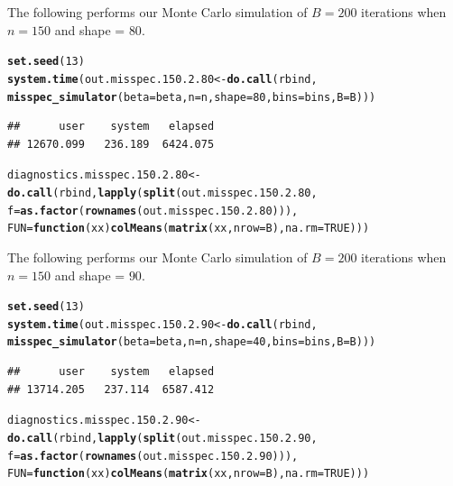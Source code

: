 \documentclass[11pt]{article}\usepackage[]{graphicx}\usepackage[]{color}
\makeatletter
\newcommand{\hlnum}[1]{\textcolor[rgb]{0.686,0.059,0.569}{#1}}%
\newcommand{\hlstd}[1]{\textcolor[rgb]{0.345,0.345,0.345}{#1}}%
\newcommand{\hlkwa}[1]{\textcolor[rgb]{0.161,0.373,0.58}{\textbf{#1}}}%
\newcommand{\hlkwb}[1]{\textcolor[rgb]{0.69,0.353,0.396}{#1}}%
\newcommand{\hlkwc}[1]{\textcolor[rgb]{0.333,0.667,0.333}{#1}}%
\newcommand{\hlkwd}[1]{\textcolor[rgb]{0.737,0.353,0.396}{\textbf{#1}}}%
\newenvironment{kframe}{%
 \def\at@end@of@kframe{}%
 \ifinner\ifhmode%
  \def\at@end@of@kframe{\end{minipage}}%
  \begin{minipage}{\columnwidth}%
 \fi\fi%
 \def\FrameCommand##1{\hskip\@totalleftmargin \hskip-\fboxsep
 \colorbox{shadecolor}{##1}\hskip-\fboxsep
     \hskip-\linewidth \hskip-\@totalleftmargin \hskip\columnwidth}%
 \MakeFramed {\advance\hsize-\width
   \@totalleftmargin\z@ \linewidth\hsize
   \@setminipage}}%
 {\par\unskip\endMakeFramed%
 \at@end@of@kframe}
\newenvironment{knitrout}{}{} %
\makeatother
\begin{document}
The following performs our Monte Carlo simulation of $B = 200$ iterations 
when $n = 150$ and shape = $80$.

\begin{knitrout}
\color{fgcolor}\begin{kframe}
\begin{alltt}
\hlkwd{set.seed}\hlstd{(}\hlnum{13}\hlstd{)}
\hlkwd{system.time}\hlstd{(out.misspec.150.2.80} \hlkwb{<-} \hlkwd{do.call}\hlstd{(rbind,}
  \hlkwd{misspec_simulator}\hlstd{(}\hlkwc{beta} \hlstd{= beta,} \hlkwc{n} \hlstd{= n,} \hlkwc{shape} \hlstd{=} \hlnum{80}\hlstd{,} \hlkwc{bins} \hlstd{= bins,} \hlkwc{B} \hlstd{= B)))}
\end{alltt}
\begin{verbatim}
##      user    system   elapsed 
## 12670.099   236.189  6424.075
\end{verbatim}
\begin{alltt}
\hlstd{diagnostics.misspec.150.2.80} \hlkwb{<-} \hlkwd{do.call}\hlstd{(rbind,} \hlkwd{lapply}\hlstd{(}\hlkwd{split}\hlstd{(out.misspec.150.2.80,}
  \hlkwc{f} \hlstd{=} \hlkwd{as.factor}\hlstd{(}\hlkwd{rownames}\hlstd{(out.misspec.150.2.80))),}
  \hlkwc{FUN} \hlstd{=} \hlkwa{function}\hlstd{(}\hlkwc{xx}\hlstd{)} \hlkwd{colMeans}\hlstd{(}\hlkwd{matrix}\hlstd{(xx,} \hlkwc{nrow} \hlstd{= B),} \hlkwc{na.rm} \hlstd{=} \hlnum{TRUE}\hlstd{)))}
\end{alltt}
\end{kframe}
\end{knitrout}


The following performs our Monte Carlo simulation of $B = 200$ iterations 
when $n = 150$ and shape = $90$.

\begin{knitrout}
\color{fgcolor}\begin{kframe}
\begin{alltt}
\hlkwd{set.seed}\hlstd{(}\hlnum{13}\hlstd{)}
\hlkwd{system.time}\hlstd{(out.misspec.150.2.90} \hlkwb{<-} \hlkwd{do.call}\hlstd{(rbind,}
  \hlkwd{misspec_simulator}\hlstd{(}\hlkwc{beta} \hlstd{= beta,} \hlkwc{n} \hlstd{= n,} \hlkwc{shape} \hlstd{=} \hlnum{40}\hlstd{,} \hlkwc{bins} \hlstd{= bins,} \hlkwc{B} \hlstd{= B)))}
\end{alltt}
\begin{verbatim}
##      user    system   elapsed 
## 13714.205   237.114  6587.412
\end{verbatim}
\begin{alltt}
\hlstd{diagnostics.misspec.150.2.90} \hlkwb{<-} \hlkwd{do.call}\hlstd{(rbind,} \hlkwd{lapply}\hlstd{(}\hlkwd{split}\hlstd{(out.misspec.150.2.90,}
  \hlkwc{f} \hlstd{=} \hlkwd{as.factor}\hlstd{(}\hlkwd{rownames}\hlstd{(out.misspec.150.2.90))),}
  \hlkwc{FUN} \hlstd{=} \hlkwa{function}\hlstd{(}\hlkwc{xx}\hlstd{)} \hlkwd{colMeans}\hlstd{(}\hlkwd{matrix}\hlstd{(xx,} \hlkwc{nrow} \hlstd{= B),} \hlkwc{na.rm} \hlstd{=} \hlnum{TRUE}\hlstd{)))}
\end{alltt}
\end{kframe}
\end{knitrout}
\end{document}
